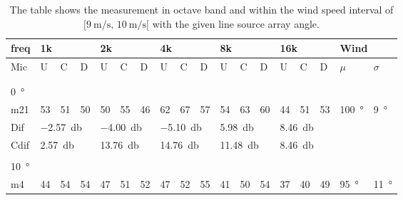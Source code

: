 \begin{table}[H]
\centering
\caption{The table shows the measurement in octave band and within the wind speed interval of $[\SI{9}{\meter\per\second},\, \SI{10}{\meter\per\second}[ $ with the given line source array angle.}
\setlength\tabcolsep{5pt} %
\begin{tabular}{l|l|l|l|l|l|l|l|l|l|l|l|l|l|l|l|l|l}
freq & \multicolumn{3}{l|}{1k} & \multicolumn{3}{l|}{2k} & \multicolumn{3}{l|}{4k} & \multicolumn{3}{l|}{8k} & \multicolumn{3}{l|}{16k}   &  \multicolumn{2}{l}{Wind}                      \\ \hline
Mic  & U      & C      & D     & U      & C      & D     & U      & C      & D     & U      & C      & D     & U  & C  & D & $\mu$ & $\sigma$ \\ \hline
 & \multicolumn{3}{l|}{} & \multicolumn{3}{l|}{} & \multicolumn{3}{l|}{} & \multicolumn{3}{l|}{} & \multicolumn{3}{l|}{} &      \multicolumn{2}{l}{}                        \\ 
 \multicolumn{18}{l}{ } \\  
\SI{0}{\degree}   & \multicolumn{3}{l|}{} & \multicolumn{3}{l|}{} & \multicolumn{3}{l|}{} & \multicolumn{3}{l|}{} &  \multicolumn{3}{l|}{}   & \multicolumn{2}{l}{} \\  \hline
m21  & 53     & 51     & 50    & 50     & 55     & 46    & 62     & 67     & 57    & 54     & 63     & 60    & 44 & 51 & 53    & \SI{100}{\degree} & \SI{9}{\degree}  \\ \hline 
Dif & \multicolumn{3}{l|}{\SI{-2.57}{\decibel}} & \multicolumn{3}{l|}{\SI{-4.00}{\decibel}} & \multicolumn{3}{l|}{\SI{-5.10}{\decibel}} & \multicolumn{3}{l|}{\SI{5.98}{\decibel}} &  \multicolumn{3}{l|}{\SI{8.46}{\decibel}}  & \multicolumn{2}{l}{} \\ \hline 
Cdif & \multicolumn{3}{l|}{\SI{2.57}{\decibel}} & \multicolumn{3}{l|}{\SI{13.76}{\decibel}} & \multicolumn{3}{l|}{\SI{14.76}{\decibel}} & \multicolumn{3}{l|}{\SI{11.48}{\decibel}} & \multicolumn{3}{l|}{\SI{8.46}{\decibel}}  &   \multicolumn{2}{l}{}   \\ 
 \multicolumn{18}{l}{ } \\                             
\SI{10}{\degree}   & \multicolumn{3}{l|}{} & \multicolumn{3}{l|}{} & \multicolumn{3}{l|}{} & \multicolumn{3}{l|}{} &  \multicolumn{3}{l|}{}   & \multicolumn{2}{l}{} \\  \hline
m4    & 44     & 54     &  54    &  47    &  51    &   52   &  47    &  52     &  55    &  41     & 50     &  54    & 37 & 40 & 49   & \SI{95}{\degree} & \SI{11}{\degree}  \\

\end{tabular}
\end{table}

